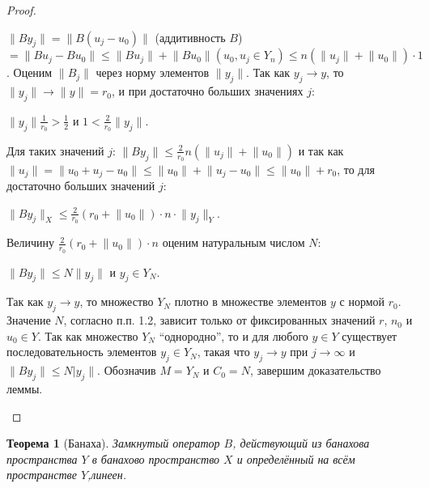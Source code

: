 \documentclass[12pt,a4paper,titlepage, oneside]{book}
\theoremstyle{definition}
\theoremstyle{plain}
\newtheorem*{theorem}{Теорема}
\theoremstyle{remark}
\theoremstyle{remark}
\theoremstyle{remark}
\theoremstyle{plain}
\theoremstyle{plain}
\begin{document}
\begin{proof}
\begin{enumerate}
$\lVert By_j\rVert = \lVert B(u_j - u_0)\rVert$ (аддитивность $B$) $ = \lVert Bu_j - Bu_0\rVert \le \lVert Bu_j\rVert + \lVert Bu_0\rVert(u_0, u_j \in Y_n) \le n(\lVert u_j\rVert + \lVert u_0\rVert)\cdot 1$.
Оценим $\lVert B_j\rVert$ через норму элементов $\lVert y_j\rVert$. Так как $y_j \to y$, то $\lVert y_j\rVert \to \lVert y\rVert=r_0$, и при достаточно больших значениях $j$:

\begin{center}
$\lVert y_j\rVert\frac{1}{r_0}>\frac12$ и $1<\frac{2}{r_0}\lVert y_j\rVert$.
\end{center}

Для таких значений $j$: $\lVert By_j\rVert\le\frac{2}{r_0}n(\lVert u_j\rVert + \lVert u_0\rVert)$ и так как $\lVert u_j\rVert = \lVert u_0 + u_j - u_0\rVert \le \lVert u_0\rVert + \lVert u_j - u_0\rVert \le \lVert u_0\rVert + r_0$, то для достаточно больших значений $j$:

\begin{center}
$\lVert By_j\rVert_X \le \frac{2}{r_0}(r_0 + \lVert u_0\rVert)\cdot n\cdot \lVert y_j\rVert_Y$.
\end{center}

Величину $\frac{2}{r_0}(r_0 + \lVert u_0\rVert)\cdot n$ оценим натуральным числом $N$:

\begin{center}
$\lVert By_j\rVert \le N\lVert y_j\rVert$ и $y_j \in Y_N$.
\end{center}

Так как $y_j \to y$, то множество $Y_N$ плотно в множестве элементов $y$ с нормой $r_0$. Значение $N$, согласно п.п. 1.2, зависит только от фиксированных значений $r$, $n_0$ и $u_0 \in Y$. Так как множество $Y_N$ ``однородно'', то и для любого $y \in Y$ существует последовательность элементов $y_j \in Y_N$, такая что $y_j \to y$ при $j \to \infty$ и $\lVert By_j\rVert \le N\lvert y_j\rVert$. Обозначив $M = Y_N$ и $C_0 = N$, завершим доказательство леммы.

\end{enumerate}

\end{proof}

\begin{theorem}[Банаха]
Замкнутый оператор $B$, действующий из банахова пространства $Y$ в банахово пространство $X$ и определённый на всём пространстве $Y$,линеен.
\end{theorem}
\end{document}

